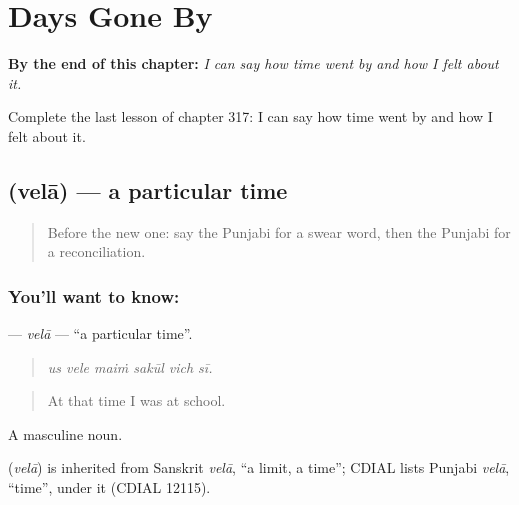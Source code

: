 
\chapter{Days Gone By}
\label{ch:pa-a2-days-gone-by}

\begin{chapteropening}
\textbf{By the end of this chapter:} \emph{I can say how time went by and how I felt about it.}

Complete the last lesson of chapter 317: I can say how time went by and how I felt about it.
\end{chapteropening}

\section[\texorpdfstring{\pa{ਵੇਲਾ} (velā)}{ਵੇਲਾ (velā)}]{ (velā) — a particular time}

\label{lesson:PA-C317-vela}



\begin{quote}
Before the new one: say the Punjabi for a swear word, then the Punjabi for a reconciliation.
\end{quote}

\subsection*{You'll want to know: }
\textbf{} — \emph{velā} — \textquotedblleft{}a particular time\textquotedblright{}.

\begin{quote}
     
\end{quote}

\begin{quote}
\emph{us vele maiṁ sakūl vich sī.}
\end{quote}

\begin{quote}
At that time I was at school.
\end{quote}

A masculine noun.

\begin{cousinweb}
\textbf{} (\emph{velā}) is inherited from Sanskrit \emph{velā}, \textquotedblleft{}a limit, a time\textquotedblright{}; CDIAL lists Punjabi \emph{velā}, \textquotedblleft{}time\textquotedblright{}, under it (CDIAL 12115).
\end{cousinweb}

